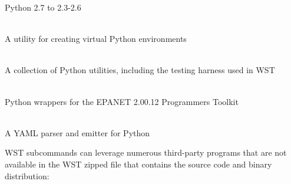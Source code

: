 \begin{description}[topsep=0pt,parsep=0.5em,itemsep=-0.4em,labelindent=2em,leftmargin=4em]
\begin{description}[topsep=0pt,parsep=0.5em,itemsep=-0.4em]
    Python 2.7 to 2.3-2.6
  \item[virtualenv]\hfill\\ A utility for creating virtual Python environments
  \end{description}
\item[PyUtilib]\hfill\\ A collection of Python utilities, including the testing
  harness used in WST
\item[PyEPANET]\hfill\\ Python wrappers for the EPANET 2.00.12 Programmers Toolkit
\item[PyYAML]\hfill\\ A YAML parser and emitter for Python
\end{description}

WST subcommands can leverage numerous third-party programs that
are not available in the WST zipped file that contains the source code and binary distribution:
